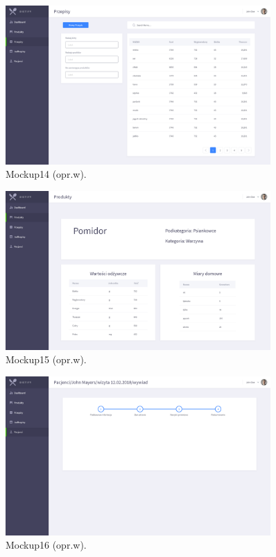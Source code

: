 \begin{minipage}{\textwidth}
    \begin{figure}[H]
        \centering\includegraphics[width=0.9\textwidth]{img/mockups/mockup14.png}
        \caption{Mockup14 (opr.w).}\label{rysunek:mockup14}
    \end{figure}
\end{minipage}

\begin{minipage}{\textwidth}
    \begin{figure}[H]
        \centering\includegraphics[width=0.9\textwidth]{img/mockups/mockup15.png}
        \caption{Mockup15 (opr.w).}\label{rysunek:mockup15}
    \end{figure}
\end{minipage}

\begin{minipage}{\textwidth}
    \begin{figure}[H]
        \centering\includegraphics[width=0.9\textwidth]{img/mockups/mockup16.png}
        \caption{Mockup16 (opr.w).}\label{rysunek:mockup16}
    \end{figure}
\end{minipage}

